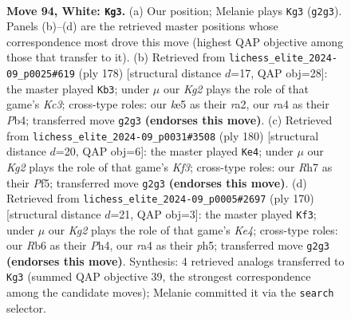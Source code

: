 \documentclass[11pt]{article}
\begin{document}
\clearpage

\begin{figure}[p]\centering
\begin{subfigure}{0.46\textwidth}\centering
\resizebox{\linewidth}{!}{%
\newchessgame
\chessboard[
  setfen={8/7R/1R2pp2/4k3/r3P3/5P2/6K1/8 w - - 0 94},
  showmover=false,
  pgfstyle=straightmove, color=movearrow, markmove={g2-g3}
]}
\caption{}
\end{subfigure}\hfill
\begin{subfigure}{0.46\textwidth}\centering
\resizebox{\linewidth}{!}{%
\newchessgame
\chessboard[
  setfen={8/7p/p5kP/4R3/PP6/2K5/r3p3/8 w - - 2 90},
  showmover=false,
  pgfstyle=straightmove, color=movearrow, markmove={c3-b3}
]}
\caption{}
\end{subfigure}
\\[4pt]
\begin{subfigure}{0.46\textwidth}\centering
\resizebox{\linewidth}{!}{%
\newchessgame
\chessboard[
  setfen={8/6k1/1R3p1p/5P1P/6P1/5K2/8/r7 w - - 91 91},
  showmover=false,
  pgfstyle=straightmove, color=movearrow, markmove={f3-e4}
]}
\caption{}
\end{subfigure}\hfill
\begin{subfigure}{0.46\textwidth}\centering
\resizebox{\linewidth}{!}{%
\newchessgame
\chessboard[
  setfen={6R1/8/4rkp1/7p/4KP1P/6P1/8/8 w - - 9 86},
  showmover=false,
  pgfstyle=straightmove, color=movearrow, markmove={e4-f3}
]}
\caption{}
\end{subfigure}
\caption{\textbf{Move 94, White: \texttt{Kg3}.} (a) Our position; Melanie plays \texttt{Kg3} (\texttt{g2g3}). Panels (b)--(d) are the retrieved master positions whose correspondence most drove this move (highest QAP objective among those that transfer to it). (b) Retrieved from \texttt{lichess\_elite\_2024-09\_p0025\#619} (ply 178) [structural distance $d$=17, QAP obj=28]: the master played \texttt{Kb3}; under $\mu$ our \emph{Kg2} plays the role of that game's \emph{Kc3}; cross-type roles: our \emph{k}e5 as their \emph{r}a2, our \emph{r}a4 as their \emph{P}b4; transferred move \texttt{g2g3} \textbf{(endorses this move)}. (c) Retrieved from \texttt{lichess\_elite\_2024-09\_p0031\#3508} (ply 180) [structural distance $d$=20, QAP obj=6]: the master played \texttt{Ke4}; under $\mu$ our \emph{Kg2} plays the role of that game's \emph{Kf3}; cross-type roles: our \emph{R}h7 as their \emph{P}f5; transferred move \texttt{g2g3} \textbf{(endorses this move)}. (d) Retrieved from \texttt{lichess\_elite\_2024-09\_p0005\#2697} (ply 170) [structural distance $d$=21, QAP obj=3]: the master played \texttt{Kf3}; under $\mu$ our \emph{Kg2} plays the role of that game's \emph{Ke4}; cross-type roles: our \emph{R}b6 as their \emph{P}h4, our \emph{r}a4 as their \emph{p}h5; transferred move \texttt{g2g3} \textbf{(endorses this move)}. Synthesis: 4 retrieved analogs transferred to \texttt{Kg3} (summed QAP objective 39, the strongest correspondence among the candidate moves); Melanie committed it via the \texttt{search} selector.}
\label{fig:thought-m186}
\end{figure}
\end{document}
